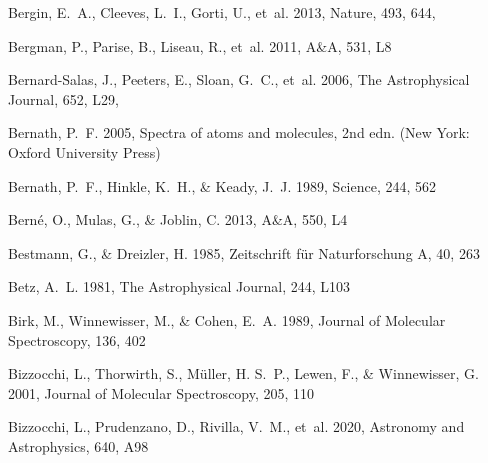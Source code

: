 \documentclass[twocolumn]{aastex631}
\begin{document}
\begin{thebibliography}{}
{Bergin}, E.~A., {Cleeves}, L.~I., {Gorti}, U., {et~al.} 2013, Nature, 493,
  644, 

Bergman, P., Parise, B., Liseau, R., {et~al.} 2011, A{\&}A, 531, L8

{Bernard-Salas}, J., {Peeters}, E., {Sloan}, G.~C., {et~al.} 2006, The
  Astrophysical Journal, 652, L29, 

Bernath, P.~F. 2005, {Spectra of atoms and molecules}, 2nd edn. (New York:
  Oxford University Press)

Bernath, P.~F., Hinkle, K.~H., \& Keady, J.~J. 1989, Science, 244, 562

Bern{\'e}, O., Mulas, G., \& Joblin, C. 2013, A{\&}A, 550, L4

Bestmann, G., \& Dreizler, H. 1985, Zeitschrift f{\"u}r Naturforschung A, 40,
  263

Betz, A.~L. 1981, The Astrophysical Journal, 244, L103

Birk, M., Winnewisser, M., \& Cohen, E.~A. 1989, Journal of Molecular
  Spectroscopy, 136, 402

Bizzocchi, L., Thorwirth, S., M{\"u}ller, H. S.~P., Lewen, F., \& Winnewisser,
  G. 2001, Journal of Molecular Spectroscopy, 205, 110

Bizzocchi, L., Prudenzano, D., Rivilla, V.~M., {et~al.} 2020, Astronomy and
  Astrophysics, 640, A98


\end{thebibliography}
\end{document}

